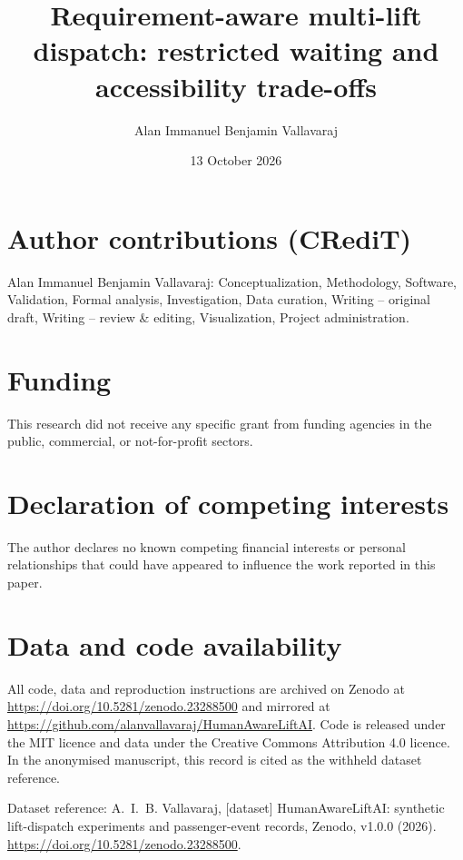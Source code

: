 \documentclass[preprint,12pt]{elsarticle}
\date{13 October 2026}
\begin{document}
\begin{frontmatter}
\title{Requirement-aware multi-lift dispatch: restricted waiting and accessibility trade-offs}
\author[westminster]{Alan Immanuel Benjamin Vallavaraj}
\end{frontmatter}

\section*{Author contributions (CRediT)}
Alan Immanuel Benjamin Vallavaraj: Conceptualization, Methodology, Software, Validation, Formal analysis, Investigation, Data curation, Writing -- original draft, Writing -- review \& editing, Visualization, Project administration.

\section*{Funding}
This research did not receive any specific grant from funding agencies in the public, commercial, or not-for-profit sectors.

\section*{Declaration of competing interests}
The author declares no known competing financial interests or personal relationships that could have appeared to influence the work reported in this paper.

\section*{Data and code availability}
All code, data and reproduction instructions are archived on Zenodo at \url{https://doi.org/10.5281/zenodo.23288500} and mirrored at \url{https://github.com/alanvallavaraj/HumanAwareLiftAI}. Code is released under the MIT licence and data under the Creative Commons Attribution 4.0 licence. In the anonymised manuscript, this record is cited as the withheld dataset reference.

Dataset reference: A.~I.~B. Vallavaraj, [dataset] HumanAwareLiftAI: synthetic lift-dispatch experiments and passenger-event records, Zenodo, v1.0.0 (2026). \url{https://doi.org/10.5281/zenodo.23288500}.
\end{document}
